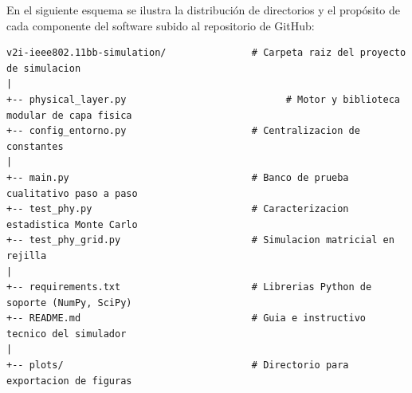 En el siguiente esquema se ilustra la distribución de directorios y el propósito de cada componente del software subido al repositorio de GitHub:

\begin{verbatim}
v2i-ieee802.11bb-simulation/               # Carpeta raiz del proyecto de simulacion
|
+-- physical_layer.py                            # Motor y biblioteca modular de capa fisica
+-- config_entorno.py                      # Centralizacion de constantes
|
+-- main.py                                # Banco de prueba cualitativo paso a paso
+-- test_phy.py                            # Caracterizacion estadistica Monte Carlo
+-- test_phy_grid.py                       # Simulacion matricial en rejilla
|
+-- requirements.txt                       # Librerias Python de soporte (NumPy, SciPy)
+-- README.md                              # Guia e instructivo tecnico del simulador
|
+-- plots/                                 # Directorio para exportacion de figuras
\end{verbatim}
